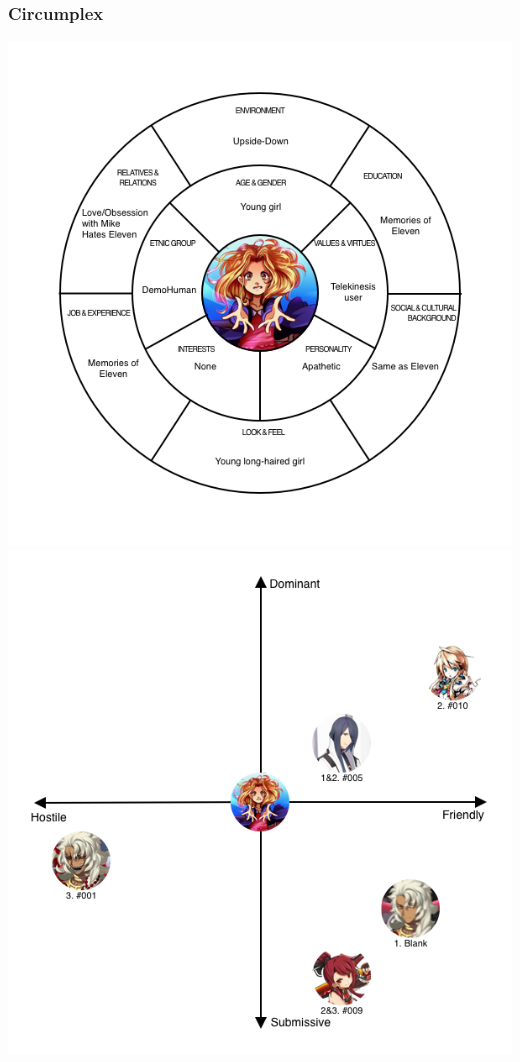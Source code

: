 \subsubsection{Circumplex}
\begin{center}
	\includegraphics[width=0.77\linewidth]{images/graphs/characters/bad_eleven_circumplex.png}
	\includegraphics[width=0.77\linewidth]{images/graphs/characters/bad_eleven_map_of_relations.png}
\end{center}

